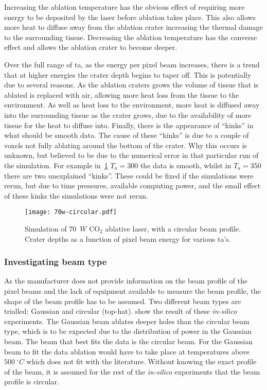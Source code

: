 Increasing the ablation temperature has the obvious effect of requiring more energy to be deposited by the laser before ablation takes place. This also allows more heat to diffuse away from the ablation crater increasing the thermal damage to the surrounding tissue. Decreasing the ablation temperature has the converse effect and allows the ablation crater to become deeper.

Over the full range of \gls*{ta}, as the energy per pixel beam increases, there is a trend that at higher energies the crater depth begins to taper off. This is potentially due to several reasons. As the ablation craters grows the volume of tissue that is ablated is replaced with air, allowing more heat loss from the tissue to the environment. As well as heat loss to the environment, more heat is diffused away into the surrounding tissue as the crater grows, due to the availability of more tissue for the heat to diffuse into.
Finally, there is the appearance of ``kinks'' in what should be smooth data.
The cause of these ``kinks'' is due to a couple of voxels not fully ablating around the bottom of the crater.
Why this occurs is unknown, but believed to be due to the numerical error in that particular run of the simulation.
For example in~\cref{fig:tacirc} $T_a=300$ the data is smooth, whilst in $T_a=350$ there are two unexplained ``kinks''.
These could be fixed if the simulations were rerun, but due to time pressures, available computing power, and the small effect of these kinks the simulations were not rerun.

\begin{figure}[!htbp]
	\centering
    \texttt{[image: 70w-circular.pdf]}
    \caption{Simulation of 70~$W$ CO$_2$ ablative laser, with a circular beam profile. Crater depths as a function of pixel beam energy for various \gls*{ta}'s.}
    \label{fig:tacirc}
\end{figure}
 


\subsubsection*{Investigating beam type}

As the manufacturer does not provide information on the beam profile of the pixel beams and the lack of equipment available to measure the beam profile, the shape of the beam profile has to be assumed. Two different beam types are trialled: Gaussian and circular (top-hat).  show the result of these \textit{in-silico} experiments. The Gaussian beam ablates deeper holes than the circular beam type, which is to be expected due to the distribution of power in the Gaussian beam. The beam that best fits the data is the circular beam. For the Gaussian beam to fit the data ablation would have to take place at temperatures above $500~^{\circ}C$ which does not fit with the literature. Without knowing the exact profile of the beam, it is assumed for the rest of the \textit{in-silico} experiments that the beam profile is circular.

